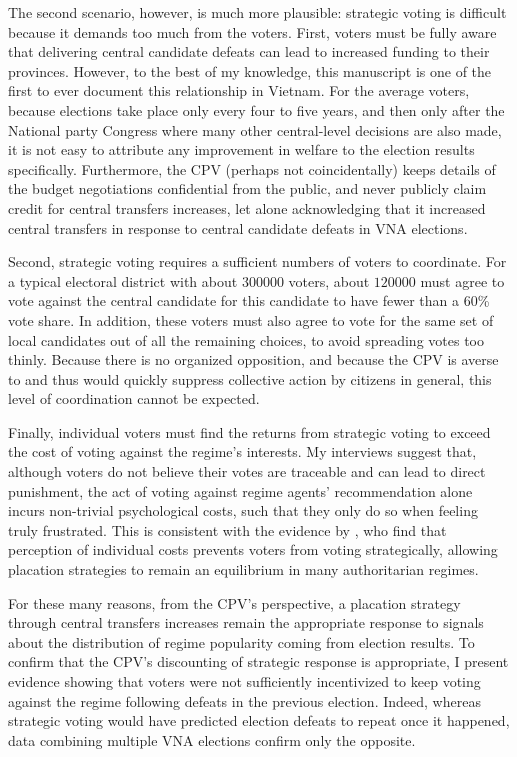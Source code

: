 \documentclass[12pt]{article}
\newcommand{\1}{\mathbbm{1}}
\begin{document}
The second scenario, however, is much more plausible: strategic voting is difficult because it demands too much from the voters. First, voters must be fully aware that delivering central candidate defeats can lead to increased funding to their provinces. However, to the best of my knowledge, this manuscript is one of the first to ever document this relationship in Vietnam. For the average voters, because elections take place only every four to five years, and then only after the National party Congress where many other central-level decisions are also made, it is not easy to attribute any improvement in welfare to the election results specifically. Furthermore, the CPV (perhaps not coincidentally) keeps details of the budget negotiations confidential from the public, and never publicly claim credit for central transfers increases, let alone acknowledging that it increased central transfers in response to central candidate defeats in VNA elections. 

Second, strategic voting requires a sufficient numbers of voters to coordinate. For a typical electoral district with about $300000$ voters, about $120000$ must agree to vote against the central candidate for this candidate to have fewer than a 60\% vote share. In addition, these voters must also agree to vote for the same set of local candidates out of all the remaining choices, to avoid spreading votes too thinly. Because there is no organized opposition, and because the CPV is averse to and thus would quickly suppress collective action by citizens in general, this level of coordination cannot be expected.

Finally, individual voters must find the returns from strategic voting to exceed the cost of voting against the regime's interests. My interviews suggest that, although voters do not believe their votes are traceable and can lead to direct punishment, the act of voting against regime agents' recommendation alone incurs non-trivial psychological costs, such that they only do so when feeling truly frustrated. This is consistent with the evidence by \citet{Miller2015}, who find that perception of individual costs prevents voters from voting strategically, allowing placation strategies to remain an equilibrium in many authoritarian regimes.

For these many reasons, from the CPV's perspective, a placation strategy through central transfers increases remain the appropriate response to signals about the distribution of regime popularity coming from election results. To confirm that the CPV's discounting of strategic response is appropriate, I present evidence showing that voters were not sufficiently incentivized to keep voting against the regime following defeats in the previous election. Indeed, whereas strategic voting would have predicted election defeats to repeat once it happened, data combining multiple VNA elections confirm only the opposite.
\end{document}
